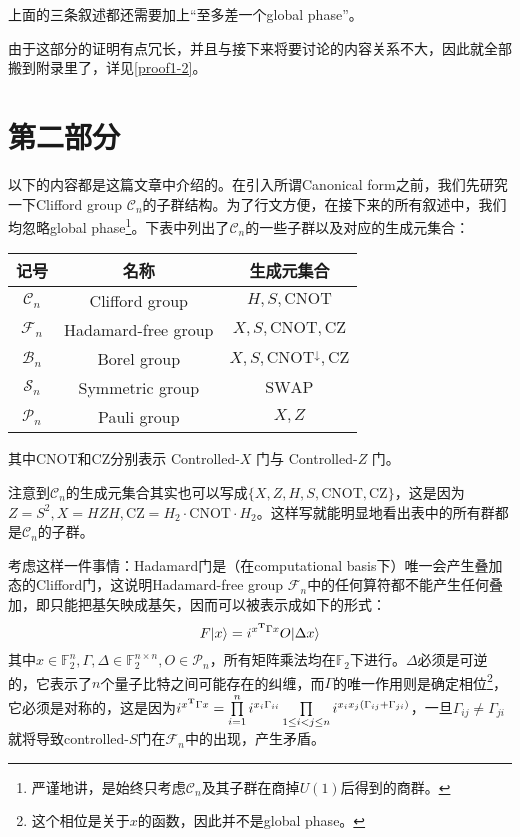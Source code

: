 \documentclass[8pt]{article}
\def \ket#1{|#1 \rangle}
\begin{document}
上面的三条叙述都还需要加上“至多差一个global phase”。

由于这部分的证明有点冗长，并且与接下来将要讨论的内容关系不大，因此就全部搬到附录里了，详见\cref{proof1-2}。

\section{第二部分}\label{partB}

以下的内容都是这篇文章\cite{paper1}中介绍的。在引入所谓Canonical form之前，我们先研究一下Clifford group $\mathcal C_n$的子群结构。为了行文方便，在接下来的所有叙述中，我们均忽略global phase\footnote{严谨地讲，是始终只考虑$\mathcal C_n$及其子群在商掉$U(1)$后得到的商群。}。下表中列出了$\mathcal C_n$的一些子群以及对应的生成元集合：

\begin{center}
	\begin{tabular}{c|c|c}
		记号 & 名称 & 生成元集合\\
		\hline
		$\mathcal C_n$ & Clifford group & $H, S, \text{CNOT}$\\
		\hline
		$\mathcal F_n$ & Hadamard-free group & $X, S, \text{CNOT}, \text{CZ}$\\
		\hline
		$\mathcal B_n$ & Borel group & $X, S, \text{CNOT}^{\downarrow}, \text{CZ}$\\
		\hline
		$\mathcal S_n$ & Symmetric group & $\text{SWAP}$\\
		\hline
		$\mathcal P_n$ & Pauli group & $X, Z$\\
	\end{tabular}
\end{center}

其中$\text{CNOT}$和$\text{CZ}$分别表示 Controlled-$X$ 门与 Controlled-$Z$ 门。

注意到$\mathcal C_n$的生成元集合其实也可以写成$\{X, Z, H, S, \text{CNOT}, \text{CZ}\}$，这是因为$Z = S^2, X = HZH, \text{CZ} = H_2\cdot\text{CNOT}\cdot H_2$。这样写就能明显地看出表中的所有群都是$\mathcal C_n$的子群。 

考虑这样一件事情：Hadamard门是（在computational basis下）唯一会产生叠加态的Clifford门，这说明Hadamard-free group $\mathcal F_n$中的任何算符都不能产生任何叠加，即只能把基矢映成基矢，因而可以被表示成如下的形式：
\begin{equation}
F\ket{x} = i^{x^{\textbf T}\Gamma x}O\ket{\Delta x}
\label{equ1}
\end{equation}
其中$x \in \mathbb F_2^{n}, \Gamma, \Delta \in \mathbb F_2^{n \times n}, O \in \mathcal P_n$，所有矩阵乘法均在$\mathbb F_2$下进行。$\Delta$必须是可逆的，它表示了$n$个量子比特之间可能存在的纠缠，而$\Gamma$的唯一作用则是确定相位\footnote{这个相位是关于$x$的函数，因此并不是global phase。}，它必须是对称的，这是因为$i^{x^{\textbf T}\Gamma x} = \prod\limits_{i=1}^{n}i^{x_i\Gamma_{ii}}\prod\limits_{1 \le i < j \le n}i^{x_ix_j(\Gamma_{ij} + \Gamma_{ji})}$，一旦$\Gamma_{ij} \neq \Gamma_{ji}$就将导致controlled-$S$门在$\mathcal F_n$中的出现，产生矛盾。
\end{document}
